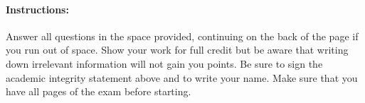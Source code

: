 \documentclass[addpoints,12pt]{exam}
\begin{document}
\begin{center}
\large
{} %

\vspace{1em}
\vspace{0.2in}
\normalsize
{}


\end{center}



\vspace{2em}
\begin{center}
\end{center}
\vspace{0.2in}

\vspace{0.2in}

\noindent{}

\vspace{0.2in}


\vspace{2em}

\begin{center}
  \gradetable[h][questions]
\end{center}

\vspace{2em}

\paragraph{Instructions:} Answer all questions in the space provided, continuing on the back of the page if you run out of space. Show your work for full credit but be aware that writing down irrelevant information will not gain you points. Be sure to sign the academic integrity statement above and to write your name. Make sure that you have all pages of the exam before starting.
\end{document}
